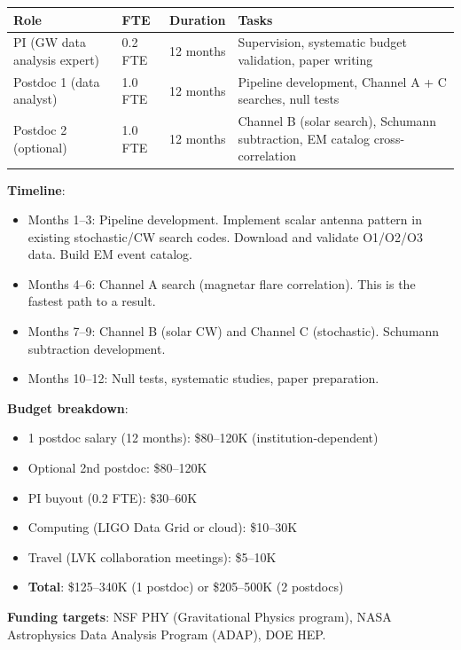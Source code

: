 \documentclass[11pt]{article}
\begin{document}
\begin{center}
\renewcommand{\arraystretch}{1.25}
\begin{tabular}{@{}p{3cm}p{3cm}p{3cm}p{4cm}@{}}
\toprule
\textbf{Role} & \textbf{FTE} & \textbf{Duration} & \textbf{Tasks} \\
\midrule
PI (GW data analysis expert) & 0.2 FTE & 12 months &
  Supervision, systematic budget validation, paper writing \\
Postdoc 1 (data analyst) & 1.0 FTE & 12 months &
  Pipeline development, Channel A + C searches, null tests \\
Postdoc 2 (optional) & 1.0 FTE & 12 months &
  Channel B (solar search), Schumann subtraction, EM catalog
  cross-correlation \\
\bottomrule
\end{tabular}
\end{center}

\textbf{Timeline}:
\begin{itemize}[nosep]
\item Months 1--3: Pipeline development. Implement scalar antenna
  pattern in existing stochastic/CW search codes. Download and
  validate O1/O2/O3 data. Build EM event catalog.
\item Months 4--6: Channel A search (magnetar flare correlation).
  This is the fastest path to a result.
\item Months 7--9: Channel B (solar CW) and Channel C (stochastic).
  Schumann subtraction development.
\item Months 10--12: Null tests, systematic studies, paper preparation.
\end{itemize}

\textbf{Budget breakdown}:
\begin{itemize}[nosep]
\item 1 postdoc salary (12 months): \$80--120K (institution-dependent)
\item Optional 2nd postdoc: \$80--120K
\item PI buyout (0.2 FTE): \$30--60K
\item Computing (LIGO Data Grid or cloud): \$10--30K
\item Travel (LVK collaboration meetings): \$5--10K
\item \textbf{Total}: \$125--340K (1 postdoc) or \$205--500K (2 postdocs)
\end{itemize}

\textbf{Funding targets}: NSF PHY (Gravitational Physics program),
NASA Astrophysics Data Analysis Program (ADAP), DOE HEP.
\end{document}
